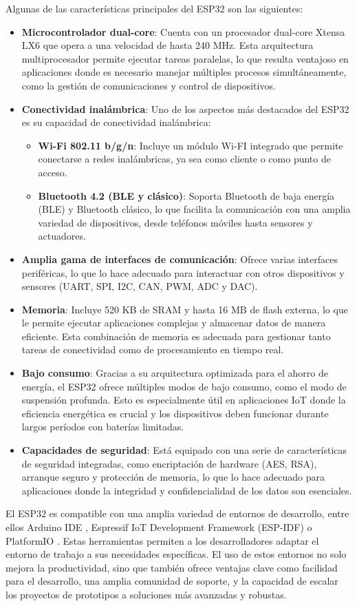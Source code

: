  
Algunas de las características principales del ESP32 son las siguientes:
\begin{itemize}
    \item \textbf{Microcontrolador dual-core}: Cuenta con un procesador dual-core Xtensa LX6 que opera a una velocidad de hasta 240 MHz. Esta arquitectura multiprocesador permite ejecutar tareas paralelas, lo que resulta ventajoso en aplicaciones donde es necesario manejar múltiples procesos simultáneamente, como la gestión de comunicaciones y control de dispositivos.
    \item \textbf{Conectividad inalámbrica}: Uno de los aspectos más destacados del ESP32 es su capacidad de conectividad inalámbrica:
        \begin{itemize}
            \item \textbf{Wi-Fi 802.11 b/g/n}: Incluye un módulo Wi-FI integrado que permite conectarse a redes inalámbricas, ya sea como cliente o como punto de acceso.
            \item \textbf{Bluetooth 4.2 (BLE y clásico)}: Soporta Bluetooth de baja energía (BLE) y Bluetooth clásico, lo que facilita la comunicación con una amplia variedad de dispositivos, desde teléfonos móviles hasta sensores y actuadores.
        \end{itemize}
    \item \textbf{Amplia gama de interfaces de comunicación}: Ofrece varias interfaces periféricas, lo que lo hace adecuado para interactuar con otros dispositivos y sensores (UART, SPI, I2C, CAN, PWM, ADC y DAC).
    \item \textbf{Memoria}: Incluye 520 KB de SRAM y hasta 16 MB de flash externa, lo que le permite ejecutar aplicaciones complejas y almacenar datos de manera eficiente. Esta combinación de memoria es adecuada para gestionar tanto tareas de conectividad como de procesamiento en tiempo real.
    \item \textbf{Bajo consumo}: Gracias a su arquitectura optimizada para el ahorro de energía, el ESP32 ofrece múltiples modos de bajo consumo, como el modo de suspensión profunda. Esto es especialmente útil en aplicaciones IoT donde la eficiencia energética es crucial y los dispositivos deben funcionar durante largos períodos con baterías limitadas.
    \item \textbf{Capacidades de seguridad}: Está equipado con una serie de características de seguridad integradas, como encriptación de hardware (AES, RSA), arranque seguro y protección de memoria, lo que lo hace adecuado para aplicaciones donde la integridad y confidencialidad de los datos son esenciales.
\end{itemize}


El ESP32 es compatible con una amplia variedad de entornos de desarrollo, entre ellos Arduino IDE \cite{arduino_ide}, Espressif IoT Development Framework (ESP-IDF) \cite{esp_ids} o PlatformIO \cite{platformio}. 
Estas herramientas permiten a los desarrolladores adaptar el entorno de trabajo a sus necesidades específicas. El uso de estos entornos no solo mejora la productividad, sino que también ofrece ventajas clave como facilidad para el desarrollo, una amplia comunidad de soporte, y la capacidad de escalar los proyectos de prototipos a soluciones más avanzadas y robustas.

